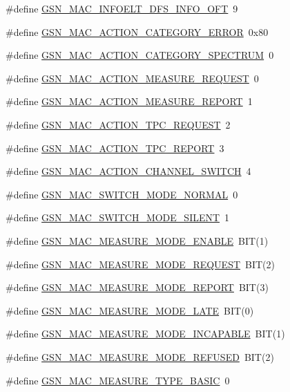 \begin{DoxyCompactItemize}
\item 
\#define \hyperlink{a00523_a32c1d8ec4dfdf2b4a810d03073563719}{GSN\_\-MAC\_\-INFOELT\_\-DFS\_\-INFO\_\-OFT}~9
\item 
\#define \hyperlink{a00523_a8a44d10ea88b5c236500204bcb1ec34c}{GSN\_\-MAC\_\-ACTION\_\-CATEGORY\_\-ERROR}~0x80
\item 
\#define \hyperlink{a00523_a569e167b9583d79d7cb4717464b27fd5}{GSN\_\-MAC\_\-ACTION\_\-CATEGORY\_\-SPECTRUM}~0
\item 
\#define \hyperlink{a00523_ad4d5c1ece860945b0f7c79046efce469}{GSN\_\-MAC\_\-ACTION\_\-MEASURE\_\-REQUEST}~0
\item 
\#define \hyperlink{a00523_a89a5e55bf83c598a581449c8391584d8}{GSN\_\-MAC\_\-ACTION\_\-MEASURE\_\-REPORT}~1
\item 
\#define \hyperlink{a00523_a65638a02a0e85ed1156d5ea86fe2e902}{GSN\_\-MAC\_\-ACTION\_\-TPC\_\-REQUEST}~2
\item 
\#define \hyperlink{a00523_a089dff0d4ff40251aace7736a46b959d}{GSN\_\-MAC\_\-ACTION\_\-TPC\_\-REPORT}~3
\item 
\#define \hyperlink{a00523_a6ecabec9d0db0c13f07ab4b844dbf676}{GSN\_\-MAC\_\-ACTION\_\-CHANNEL\_\-SWITCH}~4
\item 
\#define \hyperlink{a00523_aa799730780951744a99d7adb869b0090}{GSN\_\-MAC\_\-SWITCH\_\-MODE\_\-NORMAL}~0
\item 
\#define \hyperlink{a00523_a7ac9be1cd3437b90b96909bfafe3c460}{GSN\_\-MAC\_\-SWITCH\_\-MODE\_\-SILENT}~1
\item 
\#define \hyperlink{a00523_a85d4e004191c509e0b7213d2d18a50ec}{GSN\_\-MAC\_\-MEASURE\_\-MODE\_\-ENABLE}~BIT(1)
\item 
\#define \hyperlink{a00523_a4711dc61384764f10440570be53226ec}{GSN\_\-MAC\_\-MEASURE\_\-MODE\_\-REQUEST}~BIT(2)
\item 
\#define \hyperlink{a00523_a1c86b9077e37a8713189a0fe5a46998a}{GSN\_\-MAC\_\-MEASURE\_\-MODE\_\-REPORT}~BIT(3)
\item 
\#define \hyperlink{a00523_a4a61b205dba0589b68f26d713934b06d}{GSN\_\-MAC\_\-MEASURE\_\-MODE\_\-LATE}~BIT(0)
\item 
\#define \hyperlink{a00523_a97ec343e001bbeebc2457054e6ee30e6}{GSN\_\-MAC\_\-MEASURE\_\-MODE\_\-INCAPABLE}~BIT(1)
\item 
\#define \hyperlink{a00523_ad5e91bc3252a5b6bc9812e990958bd15}{GSN\_\-MAC\_\-MEASURE\_\-MODE\_\-REFUSED}~BIT(2)
\item 
\#define \hyperlink{a00523_a4f9b3ffcf6edbe4903e13cca181e66e1}{GSN\_\-MAC\_\-MEASURE\_\-TYPE\_\-BASIC}~0

\end{DoxyCompactItemize}
